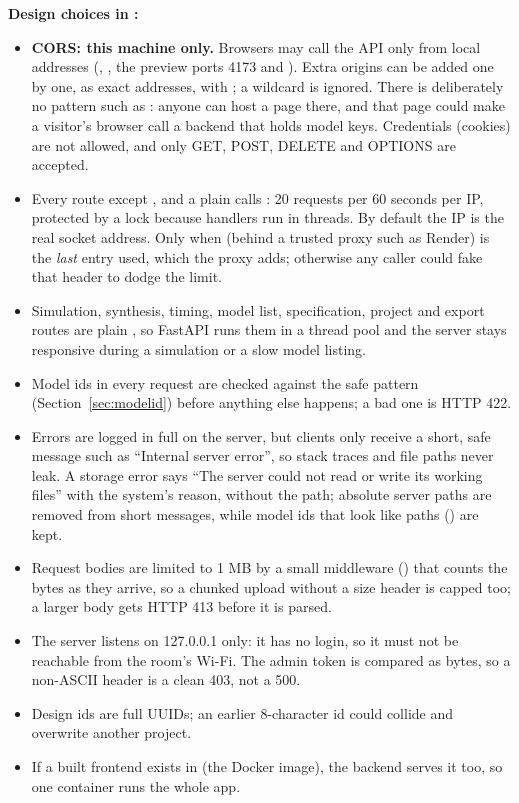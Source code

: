 \textbf{Design choices in :}
\begin{itemize}
  \item \textbf{CORS: this machine only.} Browsers may call the API only from local addresses (, , the preview ports 4173 and ). Extra origins can be added one by one, as exact addresses, with ; a wildcard is ignored. There is deliberately no pattern such as : anyone can host a page there, and that page could make a visitor's browser call a backend that holds model keys. Credentials (cookies) are not allowed, and only GET, POST, DELETE and OPTIONS are accepted.
  \item Every route except \code{/},  and a plain  calls : 20 requests per 60 seconds per IP, protected by a lock because handlers run in threads. By default the IP is the real socket address. Only when  (behind a trusted proxy such as Render) is the \emph{last}  entry used, which the proxy adds; otherwise any caller could fake that header to dodge the limit.
  \item Simulation, synthesis, timing, model list, specification, project and export routes are plain , so FastAPI runs them in a thread pool and the server stays responsive during a simulation or a slow model listing.
  \item Model ids in every request are checked against the safe pattern (Section~\ref{sec:modelid}) before anything else happens; a bad one is HTTP 422.
  \item Errors are logged in full on the server, but clients only receive a short, safe message such as ``Internal server error'', so stack traces and file paths never leak. A storage error says ``The server could not read or write its working files'' with the system's reason, without the path; absolute server paths are removed from short messages, while model ids that look like paths () are kept.
  \item Request bodies are limited to 1 MB by a small middleware () that counts the bytes as they arrive, so a chunked upload without a size header is capped too; a larger body gets HTTP 413 before it is parsed.
  \item The server listens on 127.0.0.1 only: it has no login, so it must not be reachable from the room's Wi-Fi. The admin token is compared as bytes, so a non-ASCII header is a clean 403, not a 500.
  \item Design ids are full UUIDs; an earlier 8-character id could collide and overwrite another project.
  \item If a built frontend exists in  (the Docker image), the backend serves it too, so one container runs the whole app.
\end{itemize}

